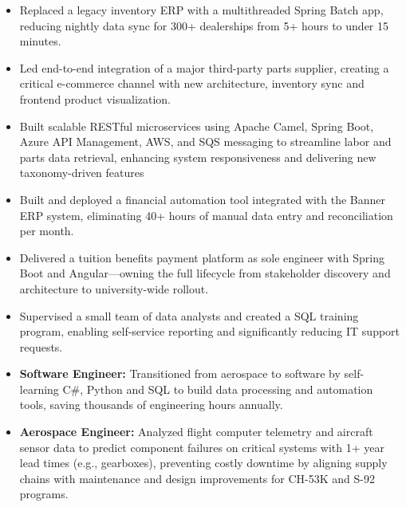 \begin{itemize}
    \item Replaced a legacy inventory ERP with a multithreaded Spring Batch app, reducing nightly data sync for 300+ dealerships from 5+ hours to under 15 minutes.
    \item Led end-to-end integration of a major third-party parts supplier, creating a critical e-commerce channel with new architecture, inventory sync and frontend product visualization.
    \item Built scalable RESTful microservices using Apache Camel, Spring Boot, Azure API Management, AWS, and SQS messaging to streamline labor and parts data retrieval, enhancing system responsiveness and delivering new taxonomy-driven features
\end{itemize}
\vspace{\spacingBetweenJobs}

\begin{itemize}
    \item Built and deployed a financial automation tool integrated with the Banner ERP system, eliminating 40+ hours of manual data entry and reconciliation per month.
    \item Delivered a tuition benefits payment platform as sole engineer with Spring Boot and Angular—owning the full lifecycle from stakeholder discovery and architecture to university-wide rollout.
    \item Supervised a small team of data analysts and created a SQL training program, enabling self-service reporting and significantly reducing IT support requests.
\end{itemize}
\vspace{\spacingBetweenJobs}

\begin{itemize}
    \item \textbf{Software Engineer:} Transitioned from aerospace to software by self-learning C\#, Python and SQL to build data processing and automation tools, saving thousands of engineering hours annually.
    \item \textbf{Aerospace Engineer:} Analyzed flight computer telemetry and aircraft sensor data to predict component failures on critical systems with 1+ year lead times (e.g., gearboxes), preventing costly downtime by aligning supply chains with maintenance and design improvements for CH-53K and S-92 programs.
\end{itemize}
\vspace{\spacingBetweenJobs}

